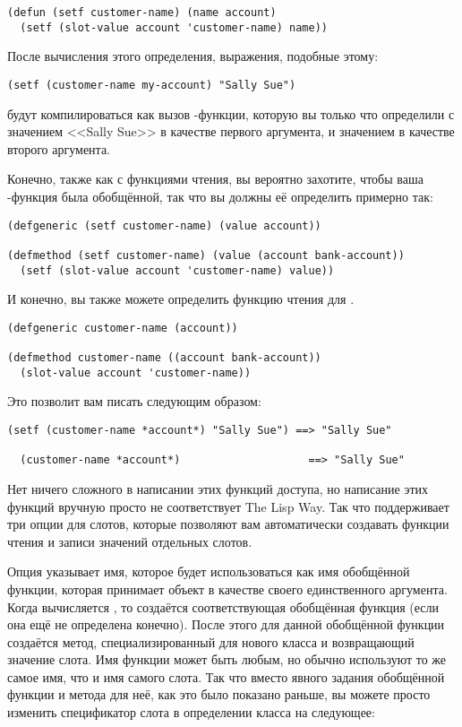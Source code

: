 \begin{lstlisting}
(defun (setf customer-name) (name account)
  (setf (slot-value account 'customer-name) name))
\end{lstlisting}

После вычисления этого определения, выражения, подобные этому:

\begin{lstlisting}
(setf (customer-name my-account) "Sally Sue")
\end{lstlisting}

будут компилироваться как вызов -функции, которую вы только что определили с
значением <<Sally Sue>> в качестве первого аргумента, и значением  в
качестве второго аргумента.

Конечно, также как с функциями чтения, вы вероятно захотите, чтобы ваша
-функция была обобщённой, так что вы должны её определить примерно так:

\begin{lstlisting}
(defgeneric (setf customer-name) (value account))

(defmethod (setf customer-name) (value (account bank-account))
  (setf (slot-value account 'customer-name) value))
\end{lstlisting}

И конечно, вы также можете определить функцию чтения для .

\begin{lstlisting}
(defgeneric customer-name (account))

(defmethod customer-name ((account bank-account))
  (slot-value account 'customer-name))
\end{lstlisting}

Это позволит вам писать следующим образом:

\begin{lstlisting}[style=lisprepl]
  (setf (customer-name *account*) "Sally Sue") ==> "Sally Sue"

  (customer-name *account*)                    ==> "Sally Sue"
\end{lstlisting}

Нет ничего сложного в написании этих функций доступа, но написание этих функций вручную
просто не соответствует The Lisp Way.  Так что  поддерживает три опции для
слотов, которые позволяют вам автоматически создавать функции чтения и записи значений
отдельных слотов.

Опция  указывает имя, которое будет использоваться как имя обобщённой
функции, которая принимает объект в качестве своего единственного аргумента.  Когда
вычисляется , то создаётся соответствующая обобщённая функция (если она ещё
не определена конечно).  После этого для данной обобщённой функции создаётся метод,
специализированный для нового класса и возвращающий значение слота.  Имя функции может
быть любым, но обычно используют то же самое имя, что и имя самого слота.  Так что вместо
явного задания обобщённой функции  и метода для неё, как это было показано
раньше, вы можете просто изменить спецификатор слота  в определении класса
 на следующее:

